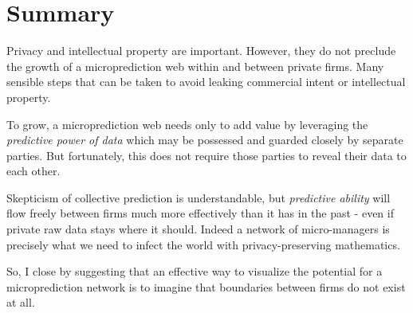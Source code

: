 \section{Summary}

Privacy and intellectual property are important. However, they do not preclude the growth of a microprediction web within and between private firms. Many sensible steps that can be taken to avoid leaking commercial intent or intellectual property. 


To grow, a microprediction web needs only to add value by leveraging the {\em predictive power of data} which may be possessed and guarded closely by separate parties. But fortunately, this does not require those parties to reveal their data to each other. 

Skepticism of collective prediction is understandable, but {\em predictive ability} will flow freely between firms much more effectively than it has in the past - even if private raw data stays where it should. Indeed a network of micro-managers is precisely what we need to infect the world with privacy-preserving mathematics. 

So, I close by suggesting that an effective way to visualize the potential for a microprediction network is to imagine that boundaries between firms do not exist at all. 



